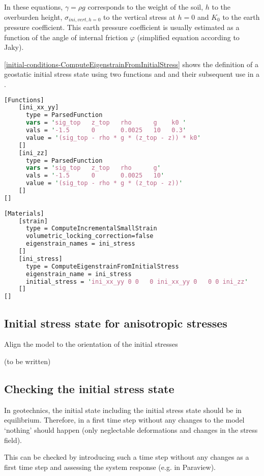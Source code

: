 In these equations, $\gamma=\rho g$ corresponds to the weight of the soil, $h$
to the overburden height, $\sigma_{ini,vert,h=0}$ to the vertical stress at
$h=0$ and $K_0$ to the earth pressure coefficient. This earth pressure
coefficient is usually estimated as a function of the angle of internal
friction $\varphi$ (simplified equation according to Jaky).

\autoref{initial-conditions-ComputeEigenstrainFromInitialStress} shows the
definition of a geostatic initial stress state using two functions
 and  and their subsequent use in a
.

\begin{lstlisting}[language=perl, float, caption={Definition of a geostatic initial stress state using ‘ComputeEigenstrainFromInitialStress’ },label={initial-conditions-ComputeEigenstrainFromInitialStress}]
[Functions]
    [ini_xx_yy]
      type = ParsedFunction
      vars = 'sig_top   z_top   rho      g    k0 '
      vals = '-1.5      0       0.0025   10   0.3'
      value = '(sig_top - rho * g * (z_top - z)) * k0'
    []
    [ini_zz]
      type = ParsedFunction
      vars = 'sig_top   z_top   rho      g'
      vals = '-1.5      0       0.0025   10'
      value = '(sig_top - rho * g * (z_top - z))'
    []
[]
  
[Materials]
    [strain]
      type = ComputeIncrementalSmallStrain
      volumetric_locking_correction=false
      eigenstrain_names = ini_stress
    []
    [ini_stress]
      type = ComputeEigenstrainFromInitialStress
      eigenstrain_name = ini_stress
      initial_stress = 'ini_xx_yy 0 0   0 ini_xx_yy 0   0 0 ini_zz'
    []
[]
\end{lstlisting}

\subsection{Initial stress state for anisotropic stresses}
\label{chap:IC-stress-state-anisotropic}

Align the model to the orientation of the initial stresses

(to be written)

\subsection{Checking the initial stress state}
\label{chap:IC-check}

In geotechnics, the initial state including the initial stress state should be
in equilibrium. Therefore, in a first time step without any changes to the
model ‘nothing’ should happen (only neglectable deformations and changes in the
stress field).

This can be checked by introducing such a time step without any changes as a
first time step and assessing the system response (e.g. in Paraview).
